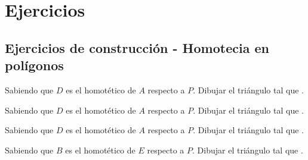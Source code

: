 \section{Ejercicios}

\subsection{Ejercicios de construcción - Homotecia en polígonos}

\begin{section-exercise}
    Sabiendo que $D$ es el homotético de $A$ respecto a $P$.
    Dibujar el triángulo  tal que .
    \vspace*{\fill}
    \begin{figure}[H]
        \centering
        
    \end{figure}
    \vspace*{\fill}
\end{section-exercise}

\newpage
\begin{section-exercise}
    Sabiendo que $D$ es el homotético de $A$ respecto a $P$.
    Dibujar el triángulo  tal que .
    \vspace*{\fill}
    \begin{figure}[H]
        \centering
        
    \end{figure}
    \vspace*{\fill}
\end{section-exercise}

\newpage
\begin{section-exercise}
    Sabiendo que $D$ es el homotético de $A$ respecto a $P$.
    Dibujar el triángulo  tal que .
    \vspace*{\fill}
    \begin{figure}[H]
        \centering
        
    \end{figure}
    \vspace*{\fill}
\end{section-exercise}

\newpage
\begin{section-exercise}
    Sabiendo que $B$ es el homotético de $E$ respecto a $P$.
    Dibujar el triángulo  tal que .
    \vspace*{\fill}
    \begin{figure}[H]
        \centering
        
    \end{figure}
    \vspace*{\fill}
\end{section-exercise}

